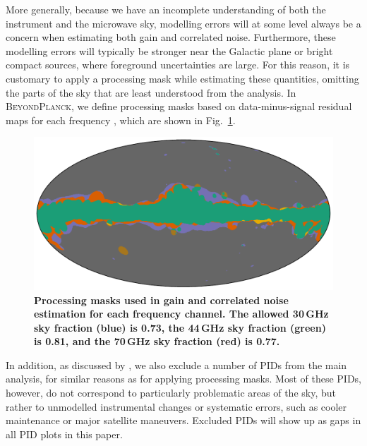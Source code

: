 \documentclass[twocolumn]{aa}
\newcommand{\BP}{\textsc{BeyondPlanck}}
\begin{document}
More generally, because we have an incomplete understanding of both
the instrument and the microwave sky, modelling errors will at some
level always be a concern when estimating both gain and correlated
noise. Furthermore, these modelling errors will typically be stronger
near the Galactic plane or bright compact sources, where foreground
uncertainties are large. For this reason, it is customary to apply a
processing mask while estimating these quantities, omitting the parts
of the sky that are least understood from the analysis. In \BP, we
define processing masks based on data-minus-signal residual maps for
each frequency \citep{bp06}, which are shown in
Fig.~\ref{fig:proc_mask}.

\begin{figure}[t]
  \center
    \includegraphics[width=\linewidth]{figs/mask_proc_BP8_v1.pdf}
    \caption{\textbf{Processing masks used in gain and correlated noise estimation for each frequency channel. The allowed 30\,GHz sky fraction (blue) is 0.73, the 44\,GHz sky fraction (green) is 0.81, and the 70\,GHz sky fraction (red) is 0.77.}}
  \label{fig:proc_mask}
\end{figure}
In addition, as discussed by \citet{bp10}, we also exclude a number of
PIDs from the main analysis, for similar reasons as for applying
processing masks. Most of these PIDs, however, do not correspond to
particularly problematic areas of the sky, but rather to unmodelled
instrumental changes or systematic errors, such as cooler maintenance or major
satellite maneuvers.  Excluded PIDs will show up as gaps in all PID plots in
this paper.
\end{document}
